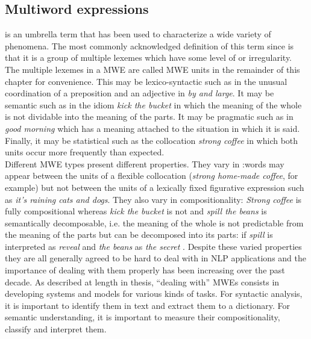 \documentclass[output=paper]{langsci/langscibook}
\begin{document}
\subsection{Multiword expressions}
\label{del:MWEs}
\indent {} is an umbrella term that has been used to characterize a wide variety of phenomena. The most commonly acknowledged definition of this term since \citet{sag02} is that it is a group of multiple lexemes which have some level of  or irregularity. The multiple lexemes in a MWE are called MWE units in the remainder of this chapter for convenience. This  may be lexico-syntactic such as in the unusual coordination of a preposition and an adjective in \textit{by and large}. It may be semantic such as in the idiom \textit{kick the bucket} in which the meaning of the whole is not dividable into the meaning of the parts. It may be pragmatic such as in \textit{good morning} which has a meaning attached to the situation in which it is said. Finally, it may be statistical such as the collocation \textit{strong coffee} in which both units occur more frequently than expected.\\
\indent Different MWE types present different properties. They vary in :\linebreak words may appear between the units of a flexible collocation (\textit{strong home-made coffee}, for example) but not between the units of a lexically fixed figurative expression such as \textit{it's raining cats and dogs}. They also vary in compositionality: \textit{Strong coffee} is fully compositional whereas \textit{kick the bucket} is not and \textit{spill the beans} is semantically decomposable, i.e. the meaning of the whole is not predictable from the meaning of the parts but can be decomposed into its parts: if \textit{spill} is interpreted as \textit{reveal} and \textit{the beans} as \textit{the secret} \citep{nunberg94}.
Despite these varied properties they are all generally agreed to be hard to deal with in NLP applications \citep{sag02} and the importance of dealing with them properly has been increasing over the past decade. As described at length in  thesis, ``dealing with'' MWEs consists in developing systems and models for various kinds of tasks. For syntactic analysis, it is important to identify them in text and extract them to a dictionary. For semantic understanding, it is important to measure their compositionality, classify and interpret them.
\end{document}
